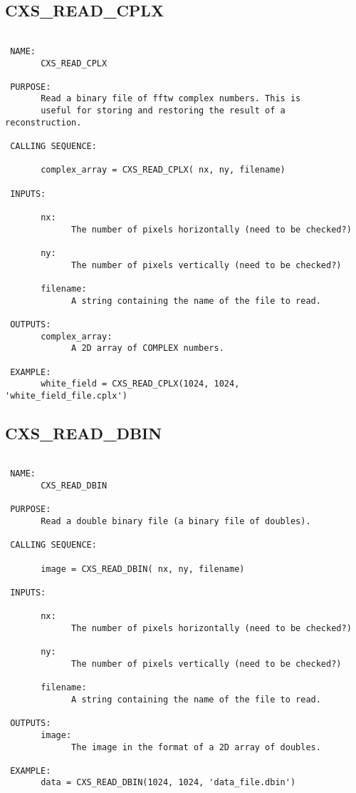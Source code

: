  
 
\subsection{CXS\_READ\_CPLX}
\begin{verbatim}

 NAME:
       CXS_READ_CPLX

 PURPOSE:
       Read a binary file of fftw complex numbers. This is
       useful for storing and restoring the result of a reconstruction.

 CALLING SEQUENCE:

       complex_array = CXS_READ_CPLX( nx, ny, filename)

 INPUTS:

       nx:
             The number of pixels horizontally (need to be checked?)

       ny:
             The number of pixels vertically (need to be checked?)

       filename:
             A string containing the name of the file to read.

 OUTPUTS:
       complex_array:
             A 2D array of COMPLEX numbers.

 EXAMPLE:
       white_field = CXS_READ_CPLX(1024, 1024, 'white_field_file.cplx')

\end{verbatim}






  
 
\subsection{CXS\_READ\_DBIN}
\begin{verbatim}

 NAME:
       CXS_READ_DBIN

 PURPOSE:
       Read a double binary file (a binary file of doubles).

 CALLING SEQUENCE:

       image = CXS_READ_DBIN( nx, ny, filename)

 INPUTS:

       nx:
             The number of pixels horizontally (need to be checked?)

       ny:
             The number of pixels vertically (need to be checked?)

       filename:
             A string containing the name of the file to read.

 OUTPUTS:
       image:
             The image in the format of a 2D array of doubles.

 EXAMPLE:
       data = CXS_READ_DBIN(1024, 1024, 'data_file.dbin')

\end{verbatim}






